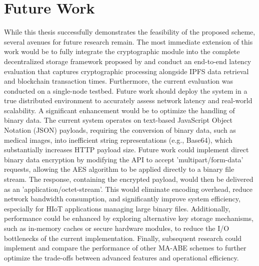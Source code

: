 \documentclass[cic,tc,english]{iiufrgs}
\numberwithin{algorithm}{chapter}
\begin{document}
    \section{Future Work}
    \label{sec:futurework}

        While this thesis successfully demonstrates the feasibility of the proposed scheme, several avenues for future research remain. The most immediate extension of this work would be to fully integrate the cryptographic module into the complete decentralized storage framework proposed by \citet{laura2023} and conduct an end-to-end latency evaluation that captures cryptographic processing alongside IPFS data retrieval and blockchain transaction times. Furthermore, the current evaluation was conducted on a single-node testbed. Future work should deploy the system in a true distributed environment to accurately assess network latency and real-world scalability. A significant enhancement would be to optimize the handling of binary data. The current system operates on text-based JavaScript Object Notation (JSON) payloads, requiring the conversion of binary data, such as medical images, into inefficient string representations (e.g., Base64), which substantially increases HTTP payload size. Future work could implement direct binary data encryption by modifying the API to accept 'multipart/form-data' requests, allowing the AES algorithm to be applied directly to a binary file stream. The response, containing the encrypted payload, would then be delivered as an 'application/octet-stream'. This would eliminate encoding overhead, reduce network bandwidth consumption, and significantly improve system efficiency, especially for HIoT applications managing large binary files. Additionally, performance could be enhanced by exploring alternative key storage mechanisms, such as in-memory caches or secure hardware modules, to reduce the I/O bottlenecks of the current implementation. Finally, subsequent research could implement and compare the performance of other MA-ABE schemes to further optimize the trade-offs between advanced features and operational efficiency.





\end{document}
